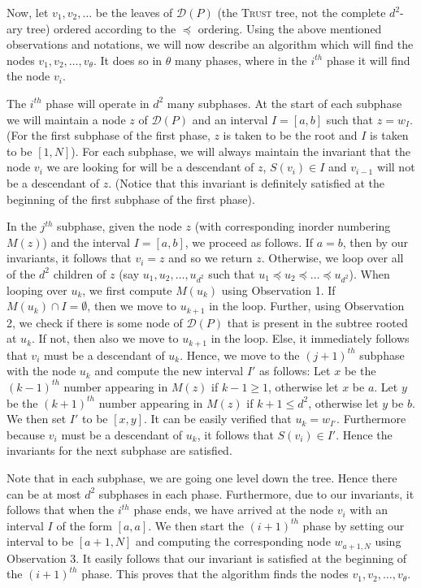 \documentclass[acmsmall]{acmart}
\newcommand{\trust}{\textsc{Trust}\xspace}
\begin{document}
Now, let $v_1,v_2,\dots$ be the leaves of $\mathcal{D}(P)$ (the \trust tree, not the complete $d^2$-ary tree) ordered according to the $\preceq$ ordering. Using the above mentioned observations and notations, we will now describe an algorithm which will find the nodes $v_1,v_2,\dots,v_{\theta}$. It does so in $\theta$ many phases, where in the $i^{th}$ phase it will find the node $v_i$.

The $i^{th}$ phase will operate in $d^2$ many subphases. At the start of each subphase
we will maintain a node $z$ of $\mathcal{D}(P)$ and an interval $I = [a,b]$ such that
$z = w_I$. (For the first subphase of the first phase, $z$ is taken to be the root and $I$ is taken to be $[1,N]$). For each subphase, we will always maintain the invariant that the node $v_i$ we are looking for will be a 
descendant of $z$, $S(v_i) \in I$ and $v_{i-1}$ will not be a descendant of $z$. (Notice that this invariant is definitely satisfied at the beginning of the first subphase of the first phase).

In the $j^{th}$ subphase, given the node $z$ (with corresponding inorder numbering $M(z)$) and the interval $I = [a,b]$, we proceed as follows. If $a = b$, then by our invariants, it follows that $v_i = z$ and so we return $z$. Otherwise, we loop over all of the $d^2$ children of $z$ (say $u_1,u_2,\dots,u_{d^2}$ such that $u_1 \preceq u_2 \preceq \dots \preceq u_{d^2}$). 
When looping over $u_k$, we first compute $M(u_k)$ using Observation 1. If $M(u_k) \cap I = \emptyset$, then we move to $u_{k+1}$ in the loop. Further, using Observation 2, we check if there is some node of $\mathcal{D}(P)$ that is present in the subtree rooted at $u_k$. If not, then also we move to $u_{k+1}$ in the loop. 
Else, it immediately follows that $v_i$ must be a descendant of $u_k$. 
Hence, we move to the $(j+1)^{th}$ subphase with the node $u_k$ and compute the new interval $I'$ as follows: Let $x$ be the $(k-1)^{th}$ number appearing in $M(z)$ if $k - 1 \ge 1$, otherwise let $x$ be $a$. Let $y$ be the $(k+1)^{th}$ number appearing in $M(z)$ if $k+1 \le d^2$, otherwise let $y$ be $b$. We then set $I'$ to be $[x,y]$. It can be easily verified that $u_k = w_{I'}$. Furthermore because $v_i$ must be a descendant of $u_k$, it follows that $S(v_i) \in I'$. Hence the invariants for the next subphase are satisfied.

Note that in each subphase, we are going one level down the tree. Hence there can be at most $d^2$ subphases in each phase. Furthermore, due to our invariants, it follows
that when the $i^{th}$ phase ends, we have arrived at the node $v_i$ with an interval $I$ of the form $[a,a]$. We then start the $(i+1)^{th}$ phase by setting our interval to be $[a+1,N]$ and computing the corresponding node $w_{a+1,N}$ using Observation 3. 
It easily follows that our invariant is satisfied at the beginning of the $(i+1)^{th}$ phase. This proves that the algorithm finds the nodes $v_1,v_2,\dots,v_{\theta}$.
\end{document}
